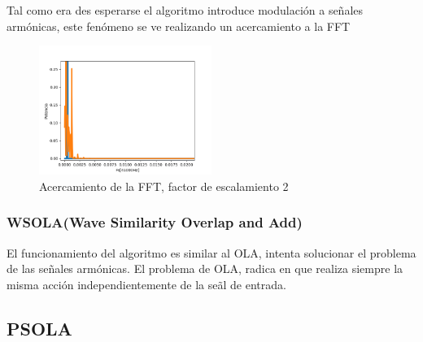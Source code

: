 \documentclass[../ASSD_TP2.tex]{subfiles}
\begin{document}
Tal como era des esperarse el algoritmo introduce modulación a se\~nales armónicas, este fenómeno se ve realizando un acercamiento a la FFT

\begin{figure}[H]
  \centering
   \includegraphics[width=0.5\textwidth]{figures/zoom.png}
  \caption{Acercamiento de la FFT, factor de escalamiento 2}
\end{figure}

\subsubsection*{WSOLA(Wave Similarity Overlap and Add)}
El funcionamiento del algoritmo es similar al OLA, intenta solucionar el problema de las se\~nales armónicas. El problema de OLA, radica en que realiza siempre la misma acción independientemente de la se\~al de entrada.

\subsection*{PSOLA}
\end{document}
